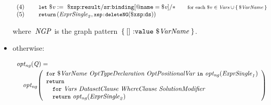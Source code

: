 \begin{itemize}
\begin{small}
\begin{equation*}
\begin{array}{l}
    \mathrm{(4)~~~~} \quad \LET~\var{v} :=~ \varR{result/sr{:}binding[@name = \var{v}]/*} \hfill \qquad \textrm{\smaller for each \var{v}~$\in \Vars \cup \set{\var{VarName}}$}\\
    \mathrm{(5)~~~~}\quad\RETURN \left(\envElem{\ExprSingle}{2}, \funcCallR{deleteNG}{\varR{ds}}\right)
\end{array}
\end{equation*}
\end{small}%
%
where~$\mathit{{NGP}_{}}$ is the graph pattern~$\left\{\: \mathtt{[]~{:}value}~\$\mathit{VarName} \:\right\}$.
%
\item otherwise:
%
\begin{small}
\begin{equation*}
\begin{array}{r@{~~~}l}
  \multicolumn{2}{l}{\funcCall{opt_{ng}}{\envElem{Q}{}} =}\\[.3em]
  & \ong{\begin{array}{l}
      \FOR~\var{VarName}~\grammarRule{OptTypeDeclaration}~\grammarRule{OptPositionalVar}~\IN~\ong{\envElem{\ExprSingle}{1}}\\
      \RETURN \\
      \quad\FOR~\Vars~\DatasetClause~\SparqlWhereClause~\SolutionModifier\\
      \quad\RETURN~\ong{\envElem{\ExprSingle}{2}}
  \end{array}
}
 \end{array}
\end{equation*}
\end{small}%
\end{itemize}



